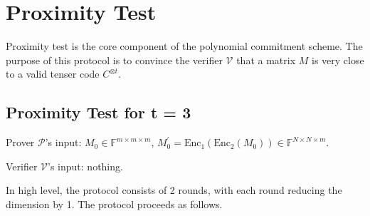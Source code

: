 \section{Proximity Test}

Proximity test is the core component of the polynomial commitment scheme. The purpose of this protocol is to convince the verifier $\mathcal{V}$ that a matrix $M$ is very close to a valid tenser code $C^{\otimes t}$.

\subsection{Proximity Test for t = 3}

Prover $\mathcal{P}$'s input: $M_0 \in \mathbb{F}^{m \times m \times m}$, $M_0^{\prime} = \text{Enc}_1(\text{Enc}_2(M_0)) \in \mathbb{F}^{N \times N \times m}$.

Verifier $\mathcal{V}$'s input: nothing.

In high level, the protocol consists of 2 rounds, with each round reducing the dimension by 1. The protocol proceeds as follows. 

